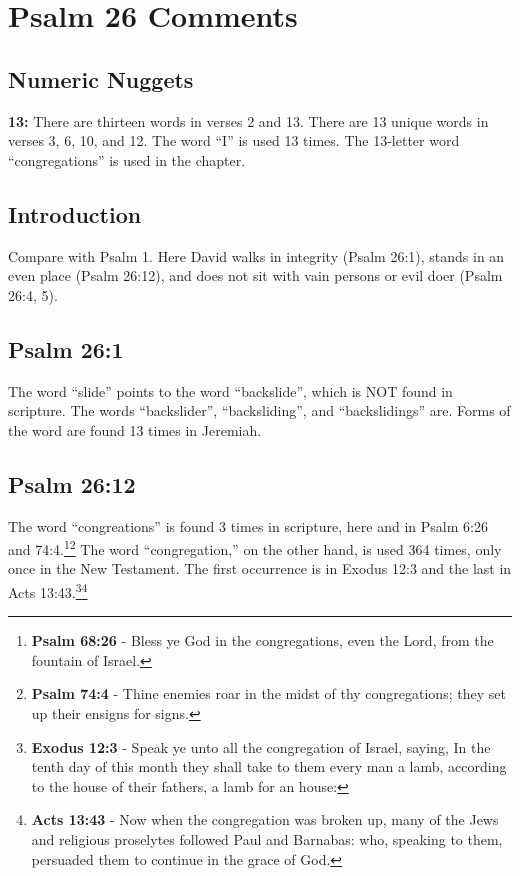 \section{Psalm 26 Comments}

\subsection{Numeric Nuggets}
\textbf{13:} There are thirteen words in verses 2 and 13. There are 13 unique words in verses 3, 6, 10, and 12. The word ``I'' is used 13 times. The 13-letter word ``congregations'' is used in the chapter. 

\subsection{Introduction}
Compare with Psalm 1. Here David walks in integrity (Psalm 26:1), stands in an even place (Psalm 26:12), and does not sit with vain persons or evil doer (Psalm 26:4, 5).

\subsection{Psalm 26:1}
The word ``slide'' points to the word ``backslide'', which is NOT found in scripture. The words ``backslider'', ``backsliding'', and ``backslidings'' are. Forms of the word are found 13 times in Jeremiah.

\subsection{Psalm 26:12}
The word ``congreations'' is found 3 times in scripture, here and in Psalm 6:26 and 74:4.\footnote{\textbf{Psalm 68:26} - Bless ye God in the congregations, even the Lord, from the fountain of Israel.}\footnote{\textbf{Psalm 74:4} - Thine enemies roar in the midst of thy congregations; they set up their ensigns for signs.} The word ``congregation,'' on the other hand, is used 364 times, only once in the New Testament. The first occurrence is in Exodus 12:3 and the last in Acts 13:43.\footnote{\textbf{Exodus 12:3} - Speak ye unto all the congregation of Israel, saying, In the tenth day of this month they shall take to them every man a lamb, according to the house of their fathers, a lamb for an house:}\footnote{\textbf{Acts 13:43} - Now when the congregation was broken up, many of the Jews and religious proselytes followed Paul and Barnabas: who, speaking to them, persuaded them to continue in the grace of God.}